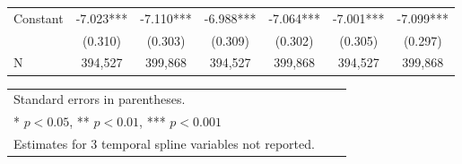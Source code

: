 \documentclass[11pt,fleqn]{article}
\begin{document}
\begin{table}[!h]
\begin{center}
\begin{singlespace}
\begin{tabularx}{7.1in}{lcccccc}
Constant            &      -7.023***&      -7.110***&      -6.988***&      -7.064***&      -7.001***&      -7.099***\\
                    &     (0.310)         &     (0.303)         &     (0.309)         &     (0.302)         &     (0.305)         &     (0.297)         \\
N &     394,527         &      399,868         &      394,527         &      399,868         &      394,527         &      399,868          \\
\hline \hline
\end{tabularx}
\begin{tabularx}{7.1in}{lcccccc}
\multicolumn{5}{X}{Standard errors in parentheses.}\\
\multicolumn{5}{l}{* \(p<0.05\), ** \(p<0.01\), *** \(p<0.001\)}\\
\multicolumn{5}{X}{Estimates for 3 temporal spline variables not reported.}\\
\end{tabularx}
\end{singlespace}
\end{center}
\end{table}

\normalsize

\clearpage

\end{document}
